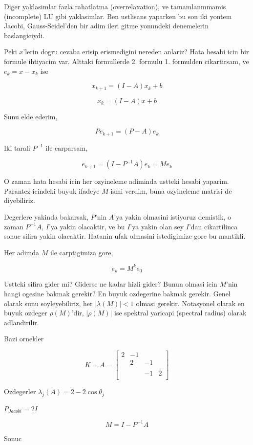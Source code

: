 \documentclass[12pt,fleqn]{article}\usepackage{../common}
\begin{document}
Diger yaklasimlar fazla rahatlatma (overrelaxation), ve tamamlanmmamis
(incomplete) LU gibi yaklasimlar. Ben ustlisans yaparken bu son iki yontem
Jacobi, Gauss-Seidel'den bir adim ileri gitme yonundeki denemelerin
baslangiciydi. 

Peki $x$'lerin dogru cevaba erisip erismedigini nereden anlariz? Hata
hesabi icin bir formule ihtiyacim var. Alttaki formullerde 2. formulu
1. formulden cikartirsam, ve $e_k = x - x_k$ ise

\[ x_{k+1} = (I - A)x_k + b \]

\[ x_k = (I - A)x + b \]

Sunu elde ederim,

\[ Pe_{k+1} = (P-A)e_k \]

Iki tarafi $P^{-1}$ ile carparsam,

\[ e_{k+1} = (I-P^{-1}A)e_k = Me_k\]

O zaman hata hesabi icin her ozyineleme adiminda ustteki hesabi
yaparim. Parantez icindeki buyuk ifadeye $M$ ismi verdim, buna ozyineleme
matrisi de diyebiliriz. 

Degerlere yakinda bakarsak, $P$'nin $A$'ya yakin olmasini istiyoruz
demistik, o zaman $P^{-1}A$, $I$'ya yakin olacaktir, ve bu $I$'ya yakin
olan sey $I$'dan cikartilinca sonuc sifira yakin olacaktir. Hatanin ufak
olmasini istedigimize gore bu mantikli. 

Her adimda $M$ ile carptigimiza gore, 

\[ e_k = M^k e_0 \]

Ustteki sifira gider mi? Giderse ne kadar hizli gider? Bunun olmasi icin
$M$'nin hangi ogesine bakmak gerekir? En buyuk ozdegerine bakmak
gerekir. Genel olarak sunu soyleyebiliriz, her $|\lambda(M)| < 1$ olmasi
gerekir. Notasyonel olarak en buyuk ozdeger $\rho(M)$'dir, $|\rho(M)|$ ise
spektral yaricapi (spectral radius) olarak adlandirilir.

Bazi ornekler

\[ K = A = 
\left[\begin{array}{rrrr}
2 & -1 && \\
& 2 & -1 & \\
&&& \\
&& -1 & 2 \\
\end{array}\right]
 \]

Ozdegerler $\lambda_j(A) = 2 - 2 \cos\theta_j$

$P_{Jacobi} = 2I$

\[ M = I-P^{-1}A  \]

Sonuc
\end{document}
